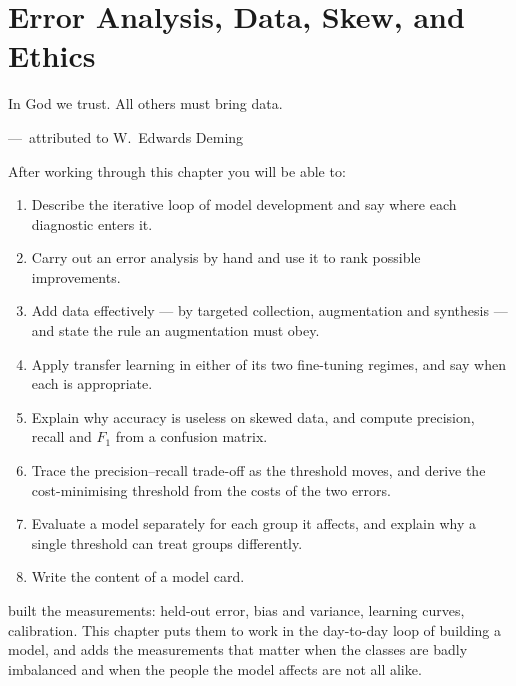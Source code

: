 
\chapter{Error Analysis, Data, Skew, and Ethics}
\label{ch:ch11}

\epigraph{In God we trust. All others must bring data.}{---\ attributed to
W.~Edwards Deming}

\begin{chapterlearning}
After working through this chapter you will be able to:
\begin{enumerate}
  \item Describe the iterative loop of model development and say where each
        diagnostic enters it.
  \item Carry out an error analysis by hand and use it to rank possible
        improvements.
  \item Add data effectively --- by targeted collection, augmentation and
        synthesis --- and state the rule an augmentation must obey.
  \item Apply transfer learning in either of its two fine-tuning regimes, and
        say when each is appropriate.
  \item Explain why accuracy is useless on skewed data, and compute precision,
        recall and $F_1$ from a confusion matrix.
  \item Trace the precision--recall trade-off as the threshold moves, and derive
        the cost-minimising threshold from the costs of the two errors.
  \item Evaluate a model separately for each group it affects, and explain why a
        single threshold can treat groups differently.
  \item Write the content of a model card.
\end{enumerate}
\end{chapterlearning}

 built the measurements: held-out error, bias and variance,
learning curves, calibration. This chapter puts them to work in the
day-to-day loop of building a model, and adds the measurements that matter when
the classes are badly imbalanced and when the people the model affects are not
all alike.


